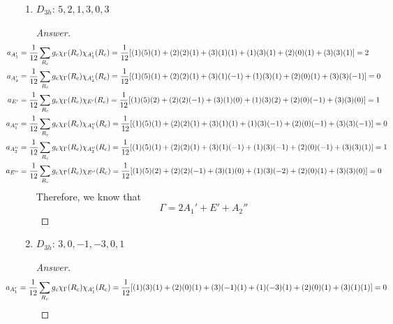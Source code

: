 \documentclass[../psets.tex]{subfiles}
\begin{document}
\begin{enumerate}[label={\Roman*)}]
    \begin{enumerate}[label={\alph*)}]
        \item $D_{3h}$: $5,2,1,3,0,3$
        \begin{proof}[Answer]
            \begin{align*}
                \hspace{-4em}a_{A_1'}  &= \frac{1}{12}\sum_{R_c}g_c\chi_\Gamma(R_c)\chi_{A_1'}(R_c)  = \frac{1}{12}[(1)(5)(1)+(2)(2)(1)+(3)(1)(1)+(1)(3)(1)+(2)(0)(1)+(3)(3)(1)] = 2\\
                \hspace{-4em}a_{A_2'}  &= \frac{1}{12}\sum_{R_c}g_c\chi_\Gamma(R_c)\chi_{A_2'}(R_c)  = \frac{1}{12}[(1)(5)(1)+(2)(2)(1)+(3)(1)(-1)+(1)(3)(1)+(2)(0)(1)+(3)(3)(-1)] = 0\\
                \hspace{-4em}a_{E'}    &= \frac{1}{12}\sum_{R_c}g_c\chi_\Gamma(R_c)\chi_{E'}(R_c)    = \frac{1}{12}[(1)(5)(2)+(2)(2)(-1)+(3)(1)(0)+(1)(3)(2)+(2)(0)(-1)+(3)(3)(0)] = 1\\
                \hspace{-4em}a_{A_1''} &= \frac{1}{12}\sum_{R_c}g_c\chi_\Gamma(R_c)\chi_{A_1''}(R_c) = \frac{1}{12}[(1)(5)(1)+(2)(2)(1)+(3)(1)(1)+(1)(3)(-1)+(2)(0)(-1)+(3)(3)(-1)] = 0\\
                \hspace{-4em}a_{A_2''} &= \frac{1}{12}\sum_{R_c}g_c\chi_\Gamma(R_c)\chi_{A_2''}(R_c) = \frac{1}{12}[(1)(5)(1)+(2)(2)(1)+(3)(1)(-1)+(1)(3)(-1)+(2)(0)(-1)+(3)(3)(1)] = 1\\
                \hspace{-4em}a_{E''}   &= \frac{1}{12}\sum_{R_c}g_c\chi_\Gamma(R_c)\chi_{E''}(R_c)   = \frac{1}{12}[(1)(5)(2)+(2)(2)(-1)+(3)(1)(0)+(1)(3)(-2)+(2)(0)(1)+(3)(3)(0)] = 0
            \end{align*}
            Therefore, we know that
            \begin{equation*}
                \boxed{\Gamma = 2A_1'+E'+A_2''}
            \end{equation*}
        \end{proof}
        \item $D_{3h}$: $3,0,-1,-3,0,1$
        \begin{proof}[Answer]
            \begin{align*}
                \hspace{-4em}a_{A_1'}  &= \frac{1}{12}\sum_{R_c}g_c\chi_\Gamma(R_c)\chi_{A_1'}(R_c)  = \frac{1}{12}[(1)(3)(1)+(2)(0)(1)+(3)(-1)(1)+(1)(-3)(1)+(2)(0)(1)+(3)(1)(1)] = 0\\

\end{align*}
\end{proof}
\end{enumerate}
\end{enumerate}
\end{document}
